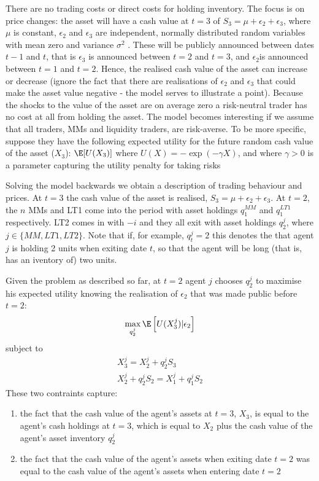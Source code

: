 \documentclass[11pt]{article}
\begin{document}
There are no trading costs or direct costs for holding inventory. The focus is on price changes: the
asset will have a cash value at \(t=3\) of \(S_3=\mu+\epsilon_2+\epsilon_3\), where \(\mu\) is
constant, \(\epsilon_2\) and \(\epsilon_3\) are independent, normally distributed random variables
with mean zero and variance \(\sigma^2\) . These will be publicly announced between dates \(t-1\) and
\(t\), that is \(\epsilon_3\) is announced between \(t=2\) and \(t=3\), and \(\epsilon_2\)is announced
between \(t=1\) and \(t=2\). Hence, the realised cash value of the asset can increase or decrease
(ignore the fact that there are realisations of \(\epsilon_2\) and \(\epsilon_3\) that could make the
asset value negative - the model serves to illustrate a point). Because the shocks to the value of the
asset are on average zero a risk-neutral trader has no cost at all from holding the asset. The model
becomes interesting if we assume that all traders, MMs and liquidity traders, are risk-averse. To be
more specific, suppose they have the following expected utility for the future random cash value of
the asset (\(X_3\)): \(\E[U(X_3)]\) where \(U(X)=-\exp(-\gamma X)\), and where \(\gamma>0\) is a
parameter capturing the utility penalty for taking risks

Solving the model backwards we obtain a description of trading behaviour and prices. At \(t=3\) the
cash value of the asset is realised, \(S_3=\mu+\epsilon_2+\epsilon_3\). At \(t=2\), the \(n\) MMs and
LT1 come into the period with asset holdings \(q_1^{MM}\) and \(q_1^{LT1}\) respectively. LT2 comes in
with \(-i\) and they all exit with asset holdings \(q_2^j\), where \(j\in\{MM,LT1,LT2\}\). Note that
if, for example, \(q_t^j=2\) this denotes the that agent \(j\) is holding 2 units when exiting date
\(t\), so that the agent will be long (that is, has an iventory of) two units.

Given the problem as described so far, at \(t=2\) agent \(j\) chooses \(q_2^j\) to maximise his
expected utility knowing the realisation of \(\epsilon_2\) that was made public before \(t=2\):
\begin{equation*}
\max_{q_2^j}\E\left[ U(X_3^j)|\epsilon_2 \right]
\end{equation*}
subject to
\begin{gather*}
X_3^j=X_2^j+q_2^jS_3\\
X_2^j+q_2^jS_2=X_1^j+q_1^jS_2
\end{gather*}
These two contraints capture:
\begin{enumerate}
\item the fact that the cash value of the agent's assets at \(t=3\), \(X_3\), is equal to the agent's
cash holdings at \(t=3\), which is equal to \(X_2\) plus the cash value of the agent's asset
inventory \(q_2^j\)
\item the fact that the cash value of the agent's assets when exiting date \(t=2\) was equal to the cash
value of the agent's assets when entering date \(t=2\)
\end{enumerate}
\end{document}
